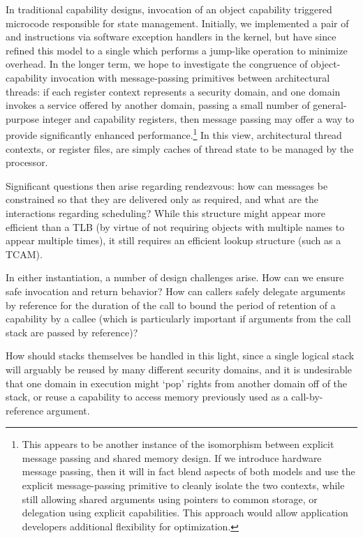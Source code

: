 In traditional capability designs, invocation of an object capability triggered microcode
responsible for state management.
Initially, we implemented a pair of  and
 instructions via software exception
handlers in the kernel, but have since refined this model to a single  which
performs a jump-like operation to minimize overhead.
In the longer term, we hope to investigate the congruence of object-capability invocation with message-passing primitives between architectural threads: if each register
context represents a security domain, and one domain invokes a service offered by
another domain, passing a small number of general-purpose integer and capability
registers, then message passing may offer a way to provide significantly enhanced
performance.\footnote{This appears to be another instance of the isomorphism
between explicit message passing and shared memory design.  If we introduce
hardware message passing, then it will in fact blend aspects of both models and
use the explicit message-passing primitive to cleanly isolate the two contexts,
while still allowing shared arguments using pointers to common storage, or
delegation using explicit capabilities.  This approach would allow application
developers additional flexibility for optimization.}
In this view, architectural thread contexts, or register files, are simply caches of thread
state to be managed by the processor.

Significant questions then arise regarding rendezvous: how can messages be
constrained so that they are delivered only as required, and what are the interactions
regarding scheduling?
While this structure
might appear more efficient than a TLB (by virtue of
not requiring objects with multiple names to appear multiple times), it still requires an
efficient lookup structure (such as a TCAM).

In either instantiation, a number of design challenges arise.
How can we ensure safe invocation and return behavior?
How can callers safely delegate arguments by reference for the duration of the
call to bound the period of retention of a capability by a callee (which is
particularly important if arguments from the call stack are passed by reference)?

How should stacks themselves be handled in this light, since a single
logical stack will arguably be reused by many different security
domains, and it is undesirable that one domain in execution might
`pop' rights from another domain off of the stack, or reuse a
capability to access memory previously used as a call-by-reference
argument.

